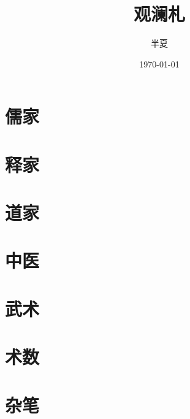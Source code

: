 \documentclass{book}
\begin{document}
  \title{观澜札}
  \author{半夏}
  \date{\today}
  \maketitle
  \setcounter{tocdepth}{2}
  \tableofcontents
  
  \part{儒家}
  \part{释家}
  \part{道家}
  \part{中医}
  \part{武术}
  \part{术数}
  \part{杂笔}
  
  \printindex
\end{document}
